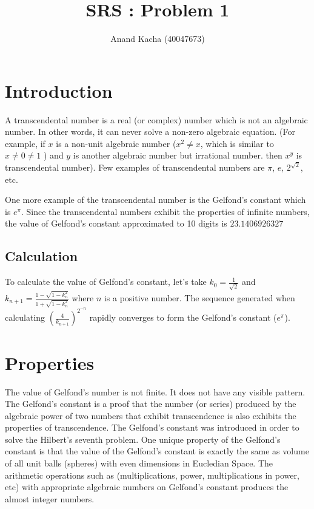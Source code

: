 \documentclass{article}
\title{SRS : Problem 1}
\author{Anand Kacha (40047673)}
\begin{document}
\maketitle

\section{Introduction}
\justifying
A transcendental number is a real (or complex) number which is not an algebraic number. In other words, it can never solve a non-zero algebraic equation. (For example, if $x$ is a non-unit algebraic number ($x^2 \ne x$, which is similar to $x \ne 0 \ne 1$ ) and $y$ is another algebraic number but irrational number. then $x^y$ is transcendental number). Few examples of transcendental numbers are $\pi$, $e$, $2^{\sqrt{2}}$, etc.
\begin{flushleft}
\justifying
One more example of the transcendental number is the Gelfond's constant which is $e^{\pi}$. Since the transcendental numbers exhibit the properties of infinite numbers, the value of Gelfond's constant approximated to 10 digits is $23.1406926327$
\end{flushleft}

\subsection{Calculation}
\begin{flushleft}
\justifying
To calculate the value of Gelfond's constant, let's take $k_0 = \frac{1}{\sqrt{2}}$ and $k_{n+1} = \frac{1 - \sqrt{1 - k_n^2}}{1 + \sqrt{1 - k_n^2}}$ where $n$ is a positive number. The sequence generated when calculating $(\frac{4}{k_{n+1}})^{2^{-n}}$ rapidly converges to form the Gelfond's constant ($e^\pi$).
\end{flushleft}

\section{Properties}
\begin{flushleft}
\justifying
The value of Gelfond's number is not finite. It does not have any visible pattern. The Gelfond's constant is a proof that the number (or series) produced by the algebraic power of two numbers that exhibit transcendence is also exhibits the properties of transcendence. The Gelfond's constant was introduced in order to solve the Hilbert's seventh problem. One unique property of the Gelfond's constant is that the value of the Gelfond's constant is exactly the same as volume of all unit balls (spheres) with even dimensions in Eucledian Space. The arithmetic operations such as (multiplications, power, multiplications in power, etc) with appropriate algebraic numbers on Gelfond's constant produces the almost integer numbers.
\end{flushleft}
\end{document}

